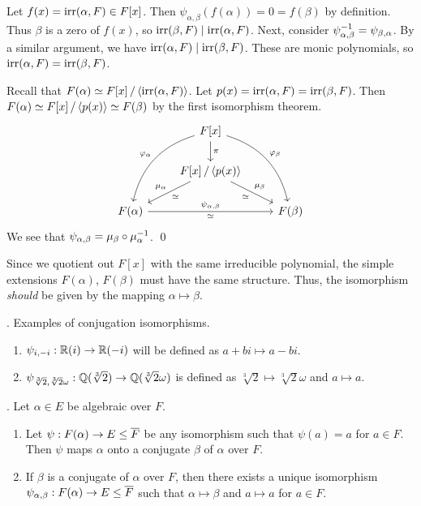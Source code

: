 \pf \note{\mimp} Let \(f(x) = \mathrm{irr}(\alpha, F) \in F[x]\). Then \(\psi_{\alpha, \beta}(f(\alpha)) = 0 = f(\beta)\) by definition. Thus \(\beta\) is a zero of \(f(x)\), so \(\mathrm{irr}(\beta, F) \mid \mathrm{irr}(\alpha, F)\). Next, consider \(\psi_{\alpha, \beta}^{-1} = \psi_{\beta, \alpha}\). By a similar argument, we have \(\mathrm{irr}(\alpha, F) \mid \mathrm{irr}(\beta, F)\). These are monic polynomials, so \(\mathrm{irr}(\alpha, F) = \mathrm{irr}(\beta, F)\).

\note{\mimpd} Recall that \(F(\alpha) \simeq F[x] \operatorname{/} \left\langle \mathrm{irr}(\alpha, F) \right\rangle\). Let \(p(x) = \mathrm{irr}(\alpha, F) = \mathrm{irr}(\beta, F)\). Then \(F(\alpha) \simeq F[x] \operatorname{/} \left\langle p(x) \right\rangle \simeq F(\beta)\) by the first isomorphism theorem.
\[
    \begin{tikzcd}
        & F[x] \arrow{d}{\pi} \arrow[bend right]{ddl}[swap]{\varphi_\alpha} \arrow[bend left]{ddr}{\varphi_\beta} & \\
        & F[x] \quotient \span{p(x)} \arrow{dl}{\simeq}[swap]{\mu_\alpha} \arrow{dr}{\mu_\beta}[swap]{\simeq} & \\
        F(\alpha) \arrow{rr}{\psi_{\alpha, \beta}}[swap]{{\simeq}} & & F(\beta)
    \end{tikzcd}
\]
We see that \(\psi_{\alpha, \beta} = \mu_\beta \circ \mu_\alpha^{-1}\). \qed

Since we quotient out \(F[x]\) with the same irreducible polynomial, the simple extensions \(F(\alpha)\), \(F(\beta)\) must have the same structure. Thus, the isomorphism \textit{should} be given by the mapping \(\alpha \mapsto \beta\).

\ex. Examples of conjugation isomorphisms.
\begin{enumerate}
    \item \(\psi_{i, -i} : \mathbb{R}(i) \rightarrow \mathbb{R}(-i)\) will be defined as \(a + bi \mapsto a - bi\).
    \item \(\psi_{\sqrt[3]{2}, \sqrt[3]{2}\omega} : \mathbb{Q}(\sqrt[3]{2}) \rightarrow \mathbb{Q}(\sqrt[3]{2}\omega)\) is defined as \(\sqrt[3]{2} \mapsto \sqrt[3]{2}\omega\) and \(a \mapsto a\).
\end{enumerate}

\cor. Let \(\alpha \in E\) be algebraic over \(F\).
\begin{enumerate}
    \item Let \(\psi : F(\alpha) \ra E \leq \bar{F}\) be any isomorphism such that \(\psi(a) = a\) for \(a \in F\). Then \(\psi\) maps \(\alpha\) onto a conjugate \(\beta\) of \(\alpha\) over \(F\).

    \item If \(\beta\) is a conjugate of \(\alpha\) over \(F\), then there exists a unique isomorphism \(\psi_{\alpha, \beta} : F(\alpha) \ra E \leq \bar{F}\) such that \(\alpha \mapsto \beta\) and \(a \mapsto a\) for \(a \in F\).
\end{enumerate}

